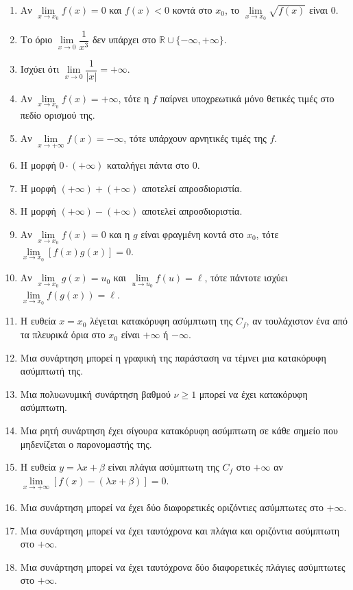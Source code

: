 \begin{enumerate}[label=\textbf{1.\arabic*.}]
    \item Αν $\lim\limits_{x\to x_0}f(x)=0$ και $f(x)<0$ κοντά στο $x_0$, το $\lim\limits_{x \to x_0} \sqrt{f(x)}$ είναι 0.
    \item Το όριο $\lim\limits_{x \to 0} \dfrac{1}{x^3}$ δεν υπάρχει στο $\mathbb{R} \cup \{-\infty, +\infty\}$.
    \item Ισχύει ότι $\lim\limits_{x \to 0} \dfrac{1}{|x|} = +\infty$.
    \item Αν $\lim\limits_{x \to x_0} f(x) = +\infty$, τότε η $f$ παίρνει υποχρεωτικά μόνο θετικές τιμές στο πεδίο ορισμού της.
    \item Αν $\lim\limits_{x \to +\infty} f(x) = -\infty$, τότε υπάρχουν αρνητικές τιμές της $f$.
    \item Η μορφή $0 \cdot (+\infty)$ καταλήγει πάντα στο 0.
    \item Η μορφή $(+\infty) + (+\infty)$ αποτελεί απροσδιοριστία.
    \item Η μορφή $(+\infty) - (+\infty)$ αποτελεί απροσδιοριστία.
    \item Αν $\lim\limits_{x \to x_0} f(x) = 0$ και η $g$ είναι φραγμένη κοντά στο $x_0$, τότε $\lim\limits_{x \to x_0} [f(x)g(x)] = 0$.
    \item Αν $\lim\limits_{x \to x_0} g(x) = u_0$ και $\lim\limits_{u \to u_0} f(u) = \ell$, τότε πάντοτε ισχύει $\lim\limits_{x \to x_0} f(g(x)) = \ell$.
    \item Η ευθεία $x=x_0$ λέγεται κατακόρυφη ασύμπτωτη της $C_f$, αν τουλάχιστον ένα από τα πλευρικά όρια στο $x_0$ είναι $+\infty$ ή $-\infty$.
    \item Μια συνάρτηση μπορεί η γραφική της παράσταση να τέμνει μια κατακόρυφη ασύμπτωτή της.
    \item Μια πολυωνυμική συνάρτηση βαθμού $\nu \ge 1$ μπορεί να έχει κατακόρυφη ασύμπτωτη.
    \item Μια ρητή συνάρτηση έχει σίγουρα κατακόρυφη ασύμπτωτη σε κάθε σημείο που μηδενίζεται ο παρονομαστής της.
    \item Η ευθεία $y = \lambda x + \beta$ είναι πλάγια ασύμπτωτη της $C_f$ στο $+\infty$ αν $\lim\limits_{x \to +\infty} [f(x) - (\lambda x + \beta)] = 0$.
    \item Μια συνάρτηση μπορεί να έχει δύο διαφορετικές οριζόντιες ασύμπτωτες στο $+\infty$.
    \item Μια συνάρτηση μπορεί να έχει ταυτόχρονα και πλάγια και οριζόντια ασύμπτωτη στο $+\infty$.
    \item Μια συνάρτηση μπορεί να έχει ταυτόχρονα δύο διαφορετικές πλάγιες ασύμπτωτες στο $+\infty$.

\end{enumerate}
